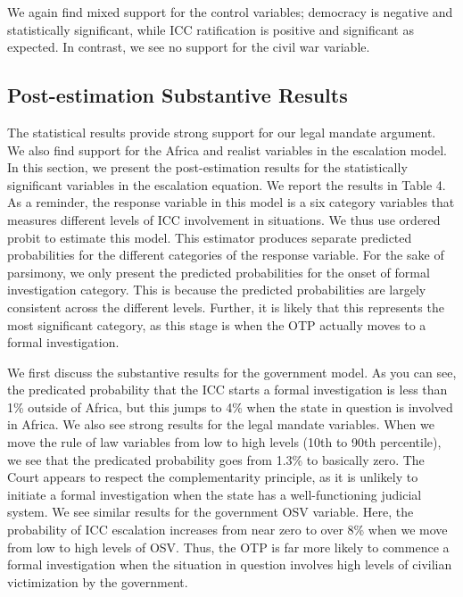 We again find mixed support for the control variables; democracy is negative and statistically significant, while ICC ratification is positive and significant as expected. In contrast, we see no support for the civil war variable.

\subsection*{Post-estimation Substantive Results}

The statistical results provide strong support for our legal mandate argument. We also find support for the Africa and realist variables in the escalation model. In this section, we present the post-estimation results for the statistically significant variables in the escalation equation.  We report the results in Table 4. As a reminder, the response variable in this model is a six category variables that measures different levels of ICC involvement in situations. We thus use ordered probit to estimate this model. This estimator produces separate predicted probabilities for the different categories of the response variable.  For the sake of parsimony, we only present the predicted probabilities for the onset of formal investigation category. This is because the predicted probabilities are largely consistent across the different levels. Further, it is likely that this represents the most significant category, as this stage is when the OTP actually moves to a formal investigation.

We first discuss the substantive results for the government model. As you can see, the predicated probability that the ICC starts a formal investigation is less than 1\% outside of Africa, but this jumps to 4\% when the state in question is involved in Africa. We also see strong results for the legal mandate variables. When we move the rule of law variables from low to high levels (10th to 90th percentile), we see that the predicated probability goes from 1.3\% to basically zero. The Court appears to respect the complementarity principle, as it is unlikely to initiate a formal investigation when the state has a well-functioning judicial system. We see similar results for the government OSV variable. Here, the probability of ICC escalation increases from near zero to over 8\% when we move from low to high levels of OSV. Thus, the OTP is far more likely to commence a formal investigation when the situation in question involves high levels of civilian victimization by the government.

